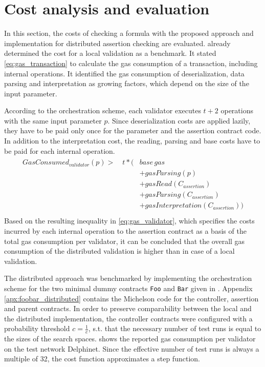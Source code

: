 \section{Cost analysis and evaluation}\label{sec:cost_analysis_distributed}
In this section, the costs of checking a formula with the proposed approach and implementation for distributed assertion checking are evaluated.  already determined the cost for a local validation as a benchmark. It stated \eqref{eq:gas_transaction} to calculate the gas consumption of a transaction, including internal operations. It identified the gas consumption of deserialization, data parsing and interpretation as growing factors, which depend on the size of the input parameter.

According to the orchestration scheme, each validator executes $t+2$ operations with the same input parameter $p$. Since deserialization costs are applied lazily, they have to be paid only once for the parameter and the assertion contract code. In addition to the interpretation cost, the reading, parsing and base costs have to be paid for each internal operation. 
\begin{align}\label{eq:gas_validator}
\begin{split}
GasConsumed_{validator}(p) > \quad t * (&base\, gas \\
&+ gasParsing(p) \\
&+ gasRead(C_{assertion}) \\
&+ gasParsing(C_{assertion}) \\
&+ gasInterpretation(C_{assertion})) \\
\end{split}
\end{align}
Based on the resulting inequality in \eqref{eq:gas_validator}, which specifies the costs incurred by each internal operation to the assertion contract as a basis of the total gas consumption per validator, it can be concluded that the overall gas consumption of the distributed validation is higher than in case of a local validation.

The distributed approach was benchmarked by implementing the orchestration scheme for the two minimal dummy contracts \texttt{Foo} and \texttt{Bar} given in . Appendix \ref{apx:foobar_distributed} contains the Michelson code for the controller, assertion and parent contracts. In order to preserve comparability between the local and the distributed implementation, the controller contracts were configured with a probability threshold $c = \frac{1}{e}$, s.t. that the necessary number of test runs is equal to the sizes of the search spaces.  shows the reported gas consumption per validator on the test network Delphinet. Since the effective number of test runs is always a multiple of 32, the cost function approximates a step function.  

